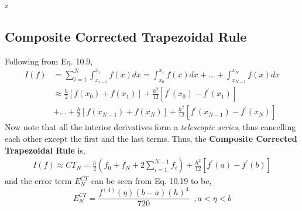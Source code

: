 z\documentclass[a4paper,12pt,twoside]{book}
\newcommand{\tit}[1]{\textit{#1}}
\begin{document}
\subsection{Composite Corrected Trapezoidal Rule}
Following from Eq. 10.9,
\begin{equation}
\begin{split}
    I(f) &= \sum_{i=1}^N\int_{x_{i-1}}^{x_{i}} f(x)dx = \int_{x_0}^{x_1} f(x)dx + \dots + \int_{x_{N-1}}^{x_N} f(x)dx\\
    &\approx \frac{h}{2}[f(x_0) + f(x_1)] + \frac{h^2}{12} [f^\prime(x_0) - f^\prime(x_1)]\\
    &+ \dots + \frac{h}{2}[f(x_{N-1}) + f(x_N)] + \frac{h^2}{12} [f^\prime(x_{N-1}) - f^\prime(x_N)]
\end{split}
\end{equation}
Now note that all the interior derivatives form a \tit{telescopic series}, thus cancelling each other except the first and the last terms. Thus, the \textbf{Composite Corrected Trapezoidal Rule} is,
\begin{equation}
    \begin{split}
    \boxed{I(f)\approx CT_N = \frac{h}{2}\left( f_0 + f_N + 2\sum_{i=1}^{N-1} f_i \right) + \frac{h^2}{12}[f^\prime(a) - f^\prime(b)]  }
    \end{split}
\end{equation}
and the error term $E_N^{CT}$ can be seen from Eq. 10.19 to be,
\begin{equation}
    E_N^{CT} = \frac{f^{(4)}(\eta)(b-a)(h)^4}{720}\;\;,a<\eta<b
\end{equation}
\end{document}
